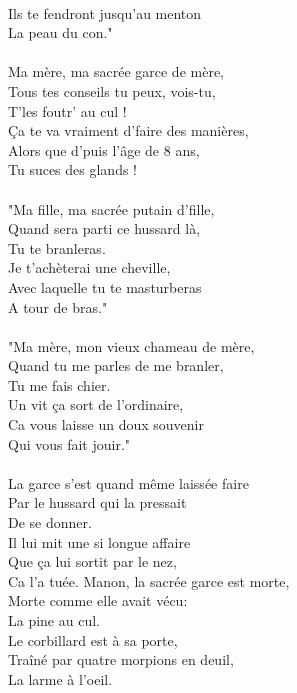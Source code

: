 \\Ils te fendront jusqu'au menton
\\La peau du con."
\\\\Ma mère, ma sacrée garce de mère,
\\Tous tes conseils tu peux, vois-tu, 
\\T'les foutr' au cul !
\\Ça te va vraiment d'faire des manières,
\\Alors que d'puis l'âge de 8 ans,
\\Tu suces des glands !
\\\\"Ma fille, ma sacrée putain d'fille,
\\Quand sera parti ce hussard là,
\\Tu te branleras.
\\Je t'achèterai une cheville,
\\Avec laquelle tu te masturberas
\\A tour de bras."
\\\\"Ma mère, mon vieux chameau de mère,
\\Quand tu me parles de me branler,
\\Tu me fais chier.
\\Un vit ça sort de l'ordinaire,
\\Ca vous laisse un doux souvenir
\\Qui vous fait jouir."
\\\\La garce s'est quand même laissée faire
\\Par le hussard qui la pressait
\\De se donner.
\\Il lui mit une si longue affaire
\\Que ça lui sortit par le nez,
\\Ca l'a tuée.
\breakpage
Manon, la sacrée garce est morte,
\\Morte comme elle avait vécu:
\\La pine au cul.
\\Le corbillard est à sa porte,
\\Traîné par quatre morpions en deuil,
\\La larme à l'oeil.
